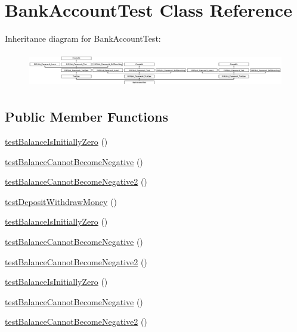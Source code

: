 \hypertarget{class_bank_account_test}{}\section{Bank\+Account\+Test Class Reference}
\label{class_bank_account_test}
Inheritance diagram for Bank\+Account\+Test\+:\begin{figure}[H]
\begin{center}
\leavevmode
\includegraphics[height=1.548672cm]{class_bank_account_test}
\end{center}
\end{figure}
\subsection*{Public Member Functions}
\begin{DoxyCompactItemize}
\item 
\mbox{\hyperlink{class_bank_account_test_a4310a4efd32e1e27b0316b486e6db401}{test\+Balance\+Is\+Initially\+Zero}} ()
\item 
\mbox{\hyperlink{class_bank_account_test_ab6da974ba63ca8ea1227cbcd33cde45a}{test\+Balance\+Cannot\+Become\+Negative}} ()
\item 
\mbox{\hyperlink{class_bank_account_test_ab2649a638e0cf85418cb1fb149d9e98c}{test\+Balance\+Cannot\+Become\+Negative2}} ()
\item 
\mbox{\hyperlink{class_bank_account_test_a9809b42f333d3a383983acdfa8d8639f}{test\+Deposit\+Withdraw\+Money}} ()
\item 
\mbox{\hyperlink{class_bank_account_test_a4310a4efd32e1e27b0316b486e6db401}{test\+Balance\+Is\+Initially\+Zero}} ()
\item 
\mbox{\hyperlink{class_bank_account_test_ab6da974ba63ca8ea1227cbcd33cde45a}{test\+Balance\+Cannot\+Become\+Negative}} ()
\item 
\mbox{\hyperlink{class_bank_account_test_ab2649a638e0cf85418cb1fb149d9e98c}{test\+Balance\+Cannot\+Become\+Negative2}} ()
\item 
\mbox{\hyperlink{class_bank_account_test_a4310a4efd32e1e27b0316b486e6db401}{test\+Balance\+Is\+Initially\+Zero}} ()
\item 
\mbox{\hyperlink{class_bank_account_test_ab6da974ba63ca8ea1227cbcd33cde45a}{test\+Balance\+Cannot\+Become\+Negative}} ()
\item 
\mbox{\hyperlink{class_bank_account_test_ab2649a638e0cf85418cb1fb149d9e98c}{test\+Balance\+Cannot\+Become\+Negative2}} ()
\end{DoxyCompactItemize}
